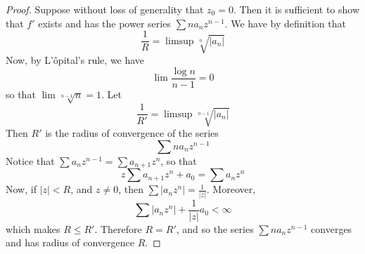 \begin{proof}
    Suppose without loss of generality that $z_0=0$. Then it is sufficient to
    show that $f'$ exists and has the power series  $\sum{na_nz^{n-1}}$. We have
    by definition that
    \begin{equation*}
        \frac{1}{R}=\limsup{\sqrt[n]{|a_n|}}
    \end{equation*}
    Now, by L'\^opital's rule, we have
    \begin{equation*}
        \lim{\frac{\log{n}}{n-1}}=0
    \end{equation*}
    so that $\lim{\sqrt[n-1]{n}}=1$. Let
    \begin{equation*}
        \frac{1}{R'}=\limsup{\sqrt[n-1]{|a_n|}}
    \end{equation*}
    Then $R'$ is the radius of convergence of the series
    \begin{equation*}
        \sum{na_nz^{n-1}}
    \end{equation*}
    Notice that $\sum{a_nz^{n-1}}=\sum{a_{n+1}z^n}$, so that
    \begin{equation*}
        z\sum{a_{n+1}z^n}+a_0=\sum{a_nz^n}
    \end{equation*}
    Now, if $|z|<R$, and  $z \neq 0$, then  $\sum{|a_nz^n|}=\frac{1}{|z|}$.
    Moreover,
    \begin{equation*}
        \sum{|a_nz^n|}+\frac{1}{|z|}a_0<\infty
    \end{equation*}
    which makes $R \leq R'$. Therefore  $R=R'$, and so the series
    $\sum{na_nz^{n-1}}$ converges and has radius of convergence $R$.


\end{proof}

